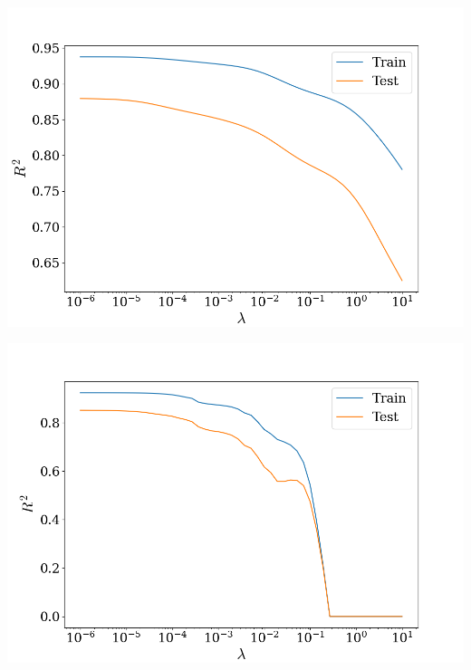 \documentclass[twoside,11pt]{report}
\begin{document}
\begin{minipage}[!t]{.48\linewidth}
    \begin{center}
        \includegraphics[width=1.0\textwidth]{../runsAndAdditions/R2OverLambdaRidge5.png}
\end{center}
\end{minipage}
\hspace{4mm}
\begin{minipage}[!t]{.48\linewidth}
    \begin{center}
        \includegraphics[width=1.0\textwidth]{../runsAndAdditions/R2OverLambdaLasso5.png}
    \end{center}
\end{minipage}\\
\end{document}
